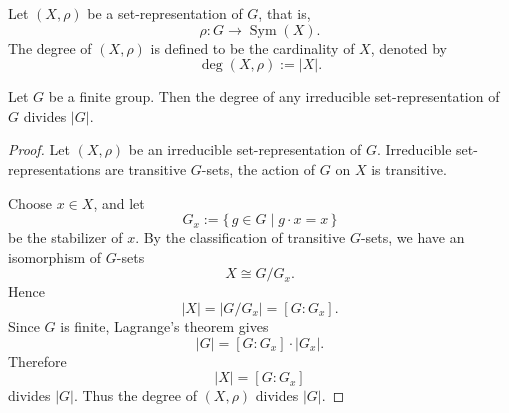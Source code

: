 \begin{definition}[Degree]
    Let \((X,\rho)\) be a set-representation of \(G\), that is,
    \[
        \rho:G\longrightarrow \operatorname{Sym}(X).
    \]
    The degree of \((X,\rho)\) is defined to be the cardinality of \(X\), denoted by
    \[
        \deg(X,\rho):=|X|.
    \]
\end{definition}

\begin{corollary}
    Let \(G\) be a finite group. Then the degree of any irreducible
    set-representation of \(G\) divides \(|G|\).
\end{corollary}

\begin{proof}
    Let \((X,\rho)\) be an irreducible set-representation of \(G\). Irreducible set-representations are transitive \(G\)-sets, the action
    of \(G\) on \(X\) is transitive.

    Choose \(x\in X\), and let
    \[
        G_x:=\{\,g\in G\mid g\cdot x=x\,\}
    \]
    be the stabilizer of \(x\). By the classification of transitive \(G\)-sets, we
    have an isomorphism of \(G\)-sets
    \[
        X\cong G/G_x.
    \]
    Hence
    \[
        |X|=|G/G_x|=[G:G_x].
    \]
    Since \(G\) is finite, Lagrange's theorem gives
    \[
        |G|=[G:G_x]\cdot |G_x|.
    \]
    Therefore
    \[
        |X|=[G:G_x]
    \]
    divides \(|G|\). Thus the degree of \((X,\rho)\) divides \(|G|\).
\end{proof}

